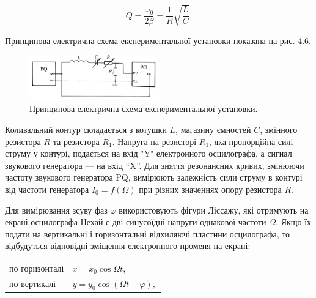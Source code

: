 \documentclass[12pt,a4paper]{article}
\begin{document}
    \vspace{0.5em}

    \begin{equation}
        Q = \frac{\omega_0}{2\beta} = \frac{1}{R} \sqrt{\frac{L}{C}}.
        \tag{4.16а}
    \end{equation}

    \vspace{0.5em}

    Принципова електрична схема експериментальної установки показана на рис. 4.6.

    \begin{figure}[h!]

        \renewcommand{\thefigure}{4.\arabic{figure}} %

        \centering
        \includegraphics[width=0.5\textwidth]{4.6.png}
        \caption{Принципова електрична схема експериментальної установки.}
        \label{fig6:schema}

    \end{figure}

    Коливальний контур складається з котушки $L$,
    магазину ємностей $C$, змінного резистора $R$ та резистора $R_1$.
    Напруга на резисторі $R_1$, яка пропорційна силі струму у контурі,
    подається на вхід "Y" електронного осцилографа, а сигнал звукового генератора --- на вхід “X”. Для зняття резонансних кривих, змінюючи
    частоту звукового генератора PQ, вимірюють залежність сили струму в контурі від частоти генератора $I_0 = f(\Omega)$ при різних значеннях опору резистора $R$.

    Для вимірювання зсуву фаз $\varphi$ використовують фігури Ліссажу,
    які отримують на екрані осцилографа
    Нехай є дві синусоїдні напруги однакової частоти $\Omega$.
    Якщо їх подати на вертикальні і горизонтальні відхиляючі
    пластини осцилографа, то
    відбудуться відповідні зміщення електронного променя на екрані:

    \vspace{0.5em}

    \begin{center}
        \begin{tabular}{ll}
            по горизонталі & \( x = x_0 \cos \Omega t, \) \\
            по вертикалі   & \( y = y_0 \cos(\Omega t + \varphi), \)
        \end{tabular}
    \end{center}
\end{document}
